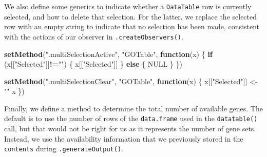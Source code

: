 \documentclass[]{book}
\newenvironment{Shaded}{\begin{snugshade}}{\end{snugshade}}
\newcommand{\KeywordTok}[1]{\textcolor[rgb]{0.13,0.29,0.53}{\textbf{#1}}}
\newcommand{\StringTok}[1]{\textcolor[rgb]{0.31,0.60,0.02}{#1}}
\newcommand{\OtherTok}[1]{\textcolor[rgb]{0.56,0.35,0.01}{#1}}
\newcommand{\ControlFlowTok}[1]{\textcolor[rgb]{0.13,0.29,0.53}{\textbf{#1}}}
\newcommand{\OperatorTok}[1]{\textcolor[rgb]{0.81,0.36,0.00}{\textbf{#1}}}
\newcommand{\NormalTok}[1]{#1}
\begin{document}
\begin{Shaded}
\end{Shaded}

We also define some generics to indicate whether a \texttt{DataTable}
row is currently selected, and how to delete that selection. For the
latter, we replace the selected row with an empty string to indicate
that no selection has been made, consistent with the actions of our
observer in \texttt{.createObservers()}.

\begin{Shaded}
\begin{Highlighting}[]
\KeywordTok{setMethod}\NormalTok{(}\StringTok{".multiSelectionActive"}\NormalTok{, }\StringTok{"GOTable"}\NormalTok{, }\ControlFlowTok{function}\NormalTok{(x) \{}
    \ControlFlowTok{if}\NormalTok{ (x[[}\StringTok{"Selected"}\NormalTok{]]}\OperatorTok{!=}\StringTok{""}\NormalTok{) \{}
\NormalTok{        x[[}\StringTok{"Selected"}\NormalTok{]]}
\NormalTok{    \} }\ControlFlowTok{else}\NormalTok{ \{}
        \OtherTok{NULL}
\NormalTok{    \}}
\NormalTok{\})}

\KeywordTok{setMethod}\NormalTok{(}\StringTok{".multiSelectionClear"}\NormalTok{, }\StringTok{"GOTable"}\NormalTok{, }\ControlFlowTok{function}\NormalTok{(x) \{}
\NormalTok{    x[[}\StringTok{"Selected"}\NormalTok{]] <-}\StringTok{ ""}
\NormalTok{    x}
\NormalTok{\})}
\end{Highlighting}
\end{Shaded}

Finally, we define a method to determine the total number of available
genes. The default is to use the number of rows of the
\texttt{data.frame} used in the \texttt{datatable()} call, but that
would not be right for us as it represents the number of gene sets.
Instead, we use the availability information that we previously stored
in the \texttt{contents} during \texttt{.generateOutput()}.
\end{document}
